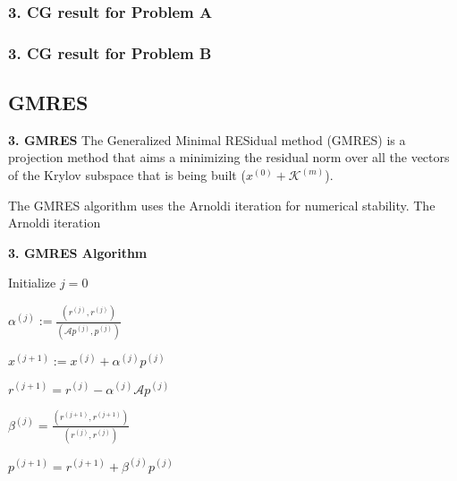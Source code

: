 \begin{frame}
	\frametitle{\textbf{3. CG result for Problem A}}
\end{frame}

\begin{frame}
	\frametitle{\textbf{3. CG result for Problem B}}
\end{frame}

\subsection{GMRES}

\begin{frame}[fragile]{\textbf{3. GMRES}}
	The Generalized Minimal RESidual method (GMRES) is a projection method that aims a minimizing the residual norm over all the vectors of the Krylov subspace that is being built ($x^{(0)}+\mathcal{K}^{(m)}$).
	
	
	The GMRES algorithm uses the Arnoldi iteration for numerical stability. The Arnoldi iteration
%	
%	
	\vspace{0.5cm}
	
\end{frame}

\begin{frame}[fragile]{\textbf{3. GMRES Algorithm}}
\begin{algorithm}[H]
	
	Initialize $j=0$
	
	{
		$\alpha^{(j)} := \frac{(r^{(j)},r^{(j)})}{(\mathcal{A}p^{(j)},p^{(j)})} $
		
		$x^{(j+1)} := x^{(j)} + \alpha^{(j)}p^{(j)}$
		
		$r^{(j+1)} = r^{(j)} - \alpha^{(j)} \mathcal{A}p^{(j)}$
		
		$\beta^{(j)} = \frac{(r^{(j+1)},r^{(j+1)})}{(r^{(j)},r^{(j)})}$
		
		$p^{(j+1)} = r^{(j+1)} + \beta^{(j)} p^{(j)}$
		
	}
\end{algorithm}
	
\end{frame}
